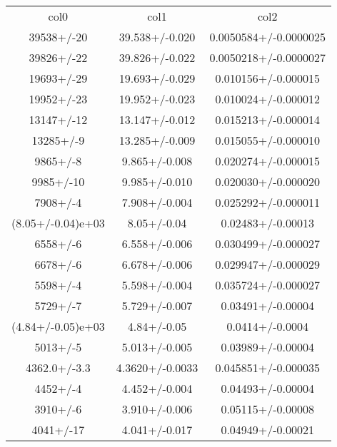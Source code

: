 \begin{table}
\begin{tabular}{ccc}
col0 & col1 & col2 \\
39538+/-20 & 39.538+/-0.020 & 0.0050584+/-0.0000025 \\
39826+/-22 & 39.826+/-0.022 & 0.0050218+/-0.0000027 \\
19693+/-29 & 19.693+/-0.029 & 0.010156+/-0.000015 \\
19952+/-23 & 19.952+/-0.023 & 0.010024+/-0.000012 \\
13147+/-12 & 13.147+/-0.012 & 0.015213+/-0.000014 \\
13285+/-9 & 13.285+/-0.009 & 0.015055+/-0.000010 \\
9865+/-8 & 9.865+/-0.008 & 0.020274+/-0.000015 \\
9985+/-10 & 9.985+/-0.010 & 0.020030+/-0.000020 \\
7908+/-4 & 7.908+/-0.004 & 0.025292+/-0.000011 \\
(8.05+/-0.04)e+03 & 8.05+/-0.04 & 0.02483+/-0.00013 \\
6558+/-6 & 6.558+/-0.006 & 0.030499+/-0.000027 \\
6678+/-6 & 6.678+/-0.006 & 0.029947+/-0.000029 \\
5598+/-4 & 5.598+/-0.004 & 0.035724+/-0.000027 \\
5729+/-7 & 5.729+/-0.007 & 0.03491+/-0.00004 \\
(4.84+/-0.05)e+03 & 4.84+/-0.05 & 0.0414+/-0.0004 \\
5013+/-5 & 5.013+/-0.005 & 0.03989+/-0.00004 \\
4362.0+/-3.3 & 4.3620+/-0.0033 & 0.045851+/-0.000035 \\
4452+/-4 & 4.452+/-0.004 & 0.04493+/-0.00004 \\
3910+/-6 & 3.910+/-0.006 & 0.05115+/-0.00008 \\
4041+/-17 & 4.041+/-0.017 & 0.04949+/-0.00021 \\
\end{tabular}
\end{table}

